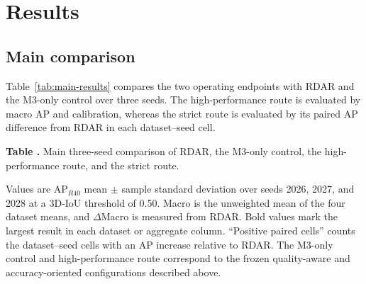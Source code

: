 \documentclass[sensors,article,submit,pdftex,moreauthors]{Definitions/mdpi}
\providecommand{\tabref}[1]{}
\renewcommand{\tabref}[1]{\textcolor{floatreviewblue}{Table~\ref{#1}}}
\renewcommand{\tabref}[1]{Table~\ref{#1}}
\begin{document}
\section{Results}
\label{sec:results}

\subsection{Main comparison}

\tabref{tab:main-results} compares the two operating endpoints with RDAR and
the M3-only control over three seeds. The high-performance route is evaluated
by macro AP and calibration, whereas the strict route is evaluated by its
paired AP difference from RDAR in each dataset--seed cell.

\begin{samepage}
\noindent
\begin{minipage}{\textwidth}
\label{tab:main-results}
\noindent\textbf{Table \thetable.} Main three-seed comparison of RDAR, the
M3-only control, the high-performance route, and the strict route.\par
\vspace{2pt}
\begingroup
\scriptsize
\setlength{\tabcolsep}{3pt}
\renewcommand{\arraystretch}{1.18}
\endgroup
\vspace{2pt}
\parbox{\textwidth}{\scriptsize
Values are AP$_{R40}$ mean $\pm$ sample standard deviation over seeds 2026,
2027, and 2028 at a 3D-IoU threshold of 0.50. Macro is the unweighted mean of
the four dataset means, and $\Delta$Macro is measured from RDAR. Bold values
mark the largest result in each dataset or aggregate column. ``Positive paired
cells'' counts the dataset--seed cells with an AP increase relative to RDAR.
The M3-only control and high-performance route correspond to the frozen
quality-aware and accuracy-oriented configurations described above.}
\end{minipage}
\end{samepage}
\end{document}

